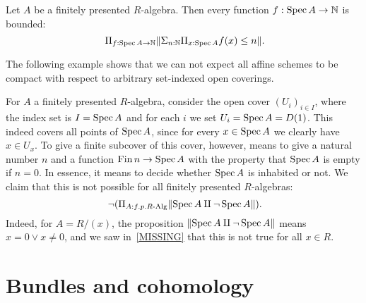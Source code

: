 \documentclass{zariski}
\begin{document}
\begin{axiom}[bound]%
  \label{bound}
  Let $A$ be a finitely presented $R$-algebra.
  Then every function $f : \operatorname{Spec} A \to \mathbb{N}$ is bounded:
  \[ \Pi_{f : \Spec A \to \N} \propTrunc{\Sigma_{n : \N} \Pi_{x : \Spec A} f(x) \le n}
     \rlap{.} \]
\end{axiom}

The following example shows that we can not expect all affine schemes
to be compact with respect to arbitrary set-indexed open coverings.

\begin{example}
  For $A$ a finitely presented $R$-algebra,
  consider the open cover ${(U_i)}_{i \in I}$,
  where the index set is $I = \operatorname{Spec} A$
  and for each $i$ we set $U_i = \operatorname{Spec} A = D(1)$.
  This indeed covers all points of $\operatorname{Spec} A$,
  since for every $x \in \operatorname{Spec} A$ we clearly have $x \in U_x$.
  To give a finite subcover of this cover, however,
  means to give a natural number $n$ and a function $\operatorname{Fin} n \to \operatorname{Spec} A$
  with the property that $\operatorname{Spec} A$ is empty if $n = 0$.
  In essence, it means to decide whether $\operatorname{Spec} A$ is inhabited or not.
  We claim that this is not possible for all finitely presented $R$-algebras:
  \[ \lnot (\Pi_{A : f.p. R\text{-Alg}} \propTrunc{\Spec A \amalg \lnot \Spec A} )
     \rlap{.} \]
  Indeed, for $A = R/(x)$,
  the proposition $\lVert \operatorname{Spec} A \amalg \lnot \operatorname{Spec} A \rVert$
  means $x = 0 \lor x \neq 0$,
  and we saw in~\ref{MISSING} that this is not true for all $x \in R$.
\end{example}


\section{Bundles and cohomology}

\end{document}
